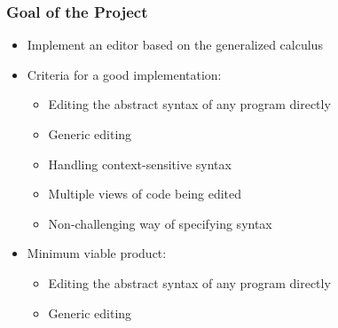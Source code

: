 \documentclass[t,24pt,aspectratio=169]{beamer}
\begin{document}
\begin{frame}[hvid]
    \frametitle{Goal of the Project}
    \begin{itemize}
        \item Implement an editor based on the generalized calculus
        \item Criteria for a good implementation:
              \begin{itemize}
                  \pause
                  \item Editing the abstract syntax of any program directly
                        \pause
                  \item Generic editing
                        \pause
                  \item Handling context-sensitive syntax
                        \pause
                  \item Multiple views of code being edited
                        \pause
                  \item Non-challenging way of specifying syntax
              \end{itemize}
              \pause
        \item Minimum viable product:
              \begin{itemize}
                  \pause
                  \item Editing the abstract syntax of any program directly
                        \pause
                  \item Generic editing
              \end{itemize}

    \end{itemize}
\end{frame}
\end{document}
